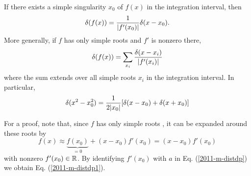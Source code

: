 If there exists a simple singularity $x_0$ of $f(x)$ in the
integration interval, then
\begin{equation}
 \delta (f(x))={1\over \vert f'(x_0)\vert }\delta(x-x_0)
.
 \end{equation}
More generally,  if $f$ has only simple roots and $f'$ is nonzero there,
\begin{equation}
 \delta (f(x))=\sum_{x_i}{\delta(x-x_i)\over \vert f'(x_i)\vert }
\label{2011-m-distdp1}
 \end{equation}
where the sum extends over all simple roots $x_i$ in
the integration interval.
In particular,
 \begin{equation}
 \delta (x^2-x_0^2)={1\over 2\vert x_0\vert }[\delta (x-x_0)+\delta
 (x+x_0)] \end{equation}
{\color{OliveGreen}
\bproof
For a proof, note that, since $f$ has only simple roots
,
it can be expanded around these roots by
$$
f(x) \approx \underbrace{f(x_0)}_{=0} +(x-x_0) f'(x_0) = (x-x_0) f'(x_0)
$$
with nonzero $f'(x_0) \in {\Bbb R}$.
By identifying  $f'(x_0)$ with $a$ in
Eq. (\ref{2011-m-distdp})
we obtain
Eq. (\ref{2011-m-distdp1}).

\eproof
}



